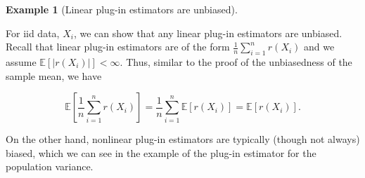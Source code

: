 \documentclass[
  13pt,
  letterpaper,
  DIV=11,
  numbers=noendperiod]{scrreprt}
\newcommand{\E}{\mathbb{E}}
\theoremstyle{plain}
\theoremstyle{plain}
\theoremstyle{definition}
\theoremstyle{definition}
\newtheorem{example}{Example}[chapter]
\theoremstyle{remark}
\begin{document}
\begin{example}[Linear plug-in estimators are
unbiased]\protect\hypertarget{exm-linear-unbiased}{}\label{exm-linear-unbiased}

For iid data, \(X_i\), we can show that any linear plug-in estimators
are unbiased. Recall that linear plug-in estimators are of the form
\(\frac{1}{n} \sum_{i=1}^n r(X_i)\) and we assume
\(\E[|r(X_i)|] < \infty\). Thus, similar to the proof of the
unbiasedness of the sample mean, we have

\[
\E\left[\frac{1}{n} \sum_{i=1}^n r(X_i)\right] = \frac{1}{n} \sum_{i=1}^n \E\left[r(X_i)\right] = \E\left[r(X_i)\right].
\]

\end{example}

On the other hand, nonlinear plug-in estimators are typically (though
not always) biased, which we can see in the example of the plug-in
estimator for the population variance.
\end{document}
